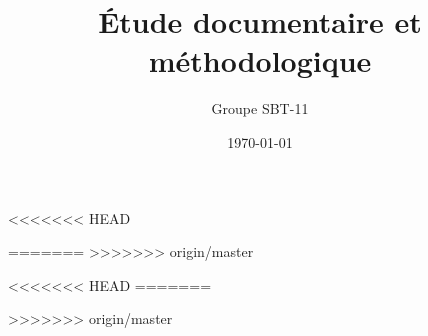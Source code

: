\documentclass[12pt,oneside,a4paper]{article}
\title{\'Etude documentaire et m\'ethodologique}
\author{Groupe SBT-11}
\date{\today}
\begin{document}
\maketitle

%

<<<<<<< HEAD

=======
%
>>>>>>> origin/master



%
%


<<<<<<< HEAD
=======
%

>>>>>>> origin/master
\end{document}
